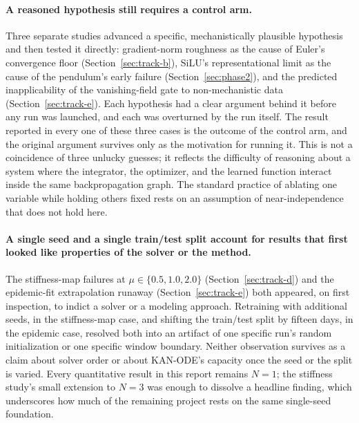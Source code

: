 \paragraph{A reasoned hypothesis still requires a control arm.} Three separate
studies advanced a specific, mechanistically plausible hypothesis and then
tested it directly: gradient-norm roughness as the cause of Euler's
convergence floor (Section~\ref{sec:track-b}), SiLU's representational limit
as the cause of the pendulum's early failure (Section~\ref{sec:phase2}), and
the predicted inapplicability of the vanishing-field gate to non-mechanistic
data (Section~\ref{sec:track-e}). Each hypothesis had a clear argument behind it
before any run was launched, and each was overturned by the run itself. The
result reported in every one of these three cases is the outcome of the
control arm, and the original argument survives only as the motivation for
running it. This is not a coincidence of three unlucky guesses; it reflects
the difficulty of reasoning about a system where the integrator, the
optimizer, and the learned function interact inside the same backpropagation
graph. The standard practice of ablating one variable while holding others
fixed rests on an assumption of near-independence that does not hold here.

\paragraph{A single seed and a single train/test split account for results
that first looked like properties of the solver or the method.} The
stiffness-map failures at $\mu\in\{0.5,1.0,2.0\}$ (Section~\ref{sec:track-d})
and the epidemic-fit extrapolation runaway (Section~\ref{sec:track-e}) both
appeared, on first inspection, to indict a solver or a modeling approach.
Retraining with additional seeds, in the stiffness-map case, and shifting the
train/test split by fifteen days, in the epidemic case, resolved both into an
artifact of one specific run's random initialization or one specific window
boundary. Neither observation survives as a claim about solver order or about
KAN-ODE's capacity once the seed or the split is varied. Every quantitative
result in this report remains $N=1$; the stiffness study's small extension
to $N=3$ was enough to dissolve a headline finding, which underscores how
much of the remaining project rests on the same single-seed foundation.

